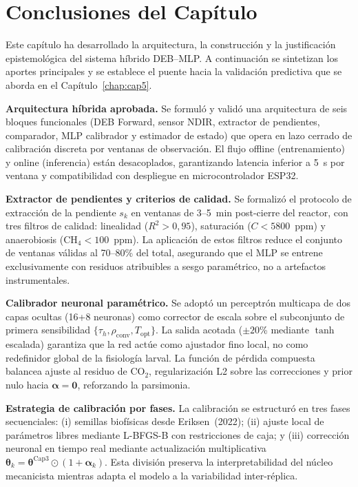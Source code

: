 \section{Conclusiones del Capítulo}
\label{sec:cap4_conclusiones}

Este capítulo ha desarrollado la arquitectura, la construcción y la justificación epistemológica del sistema híbrido DEB--MLP. A continuación se sintetizan los aportes principales y se establece el puente hacia la validación predictiva que se aborda en el Capítulo~\ref{chap:cap5}.

\textbf{Arquitectura híbrida aprobada.} Se formuló y validó una arquitectura de seis bloques funcionales (DEB Forward, sensor NDIR, extractor de pendientes, comparador, MLP calibrador y estimador de estado) que opera en lazo cerrado de calibración discreta por ventanas de observación. El flujo offline (entrenamiento) y online (inferencia) están desacoplados, garantizando latencia inferior a 5~s por ventana y compatibilidad con despliegue en microcontrolador ESP32.

\textbf{Extractor de pendientes y criterios de calidad.} Se formalizó el protocolo de extracción de la pendiente $s_k$ en ventanas de 3--5~min post-cierre del reactor, con tres filtros de calidad: linealidad ($R^2 > 0{,}95$), saturación ($C < 5800$~ppm) y anaerobiosis ($\mathrm{CH_4} < 100$~ppm). La aplicación de estos filtros reduce el conjunto de ventanas válidas al 70--80\% del total, asegurando que el MLP se entrene exclusivamente con residuos atribuibles a sesgo paramétrico, no a artefactos instrumentales.

\textbf{Calibrador neuronal paramétrico.} Se adoptó un perceptrón multicapa de dos capas ocultas (16+8 neuronas) como corrector de escala sobre el subconjunto de primera sensibilidad $\{\tau_h, \rho_{\mathrm{conv}}, T_{\mathrm{opt}}\}$. La salida acotada ($\pm 20$\% mediante $\tanh$ escalada) garantiza que la red actúe como ajustador fino local, no como redefinidor global de la fisiología larval. La función de pérdida compuesta balancea ajuste al residuo de CO$_2$, regularización L2 sobre las correcciones y prior nulo hacia $\boldsymbol{\alpha} = \mathbf{0}$, reforzando la parsimonia.

\textbf{Estrategia de calibración por fases.} La calibración se estructuró en tres fases secuenciales: (i) semillas biofísicas desde Eriksen~(2022); (ii) ajuste local de parámetros libres mediante L-BFGS-B con restricciones de caja; y (iii) corrección neuronal en tiempo real mediante actualización multiplicativa $\boldsymbol{\theta}_k = \boldsymbol{\theta}^{\mathrm{Cap3}} \odot (1+\boldsymbol{\alpha}_k)$. Esta división preserva la interpretabilidad del núcleo mecanicista mientras adapta el modelo a la variabilidad inter-réplica.

